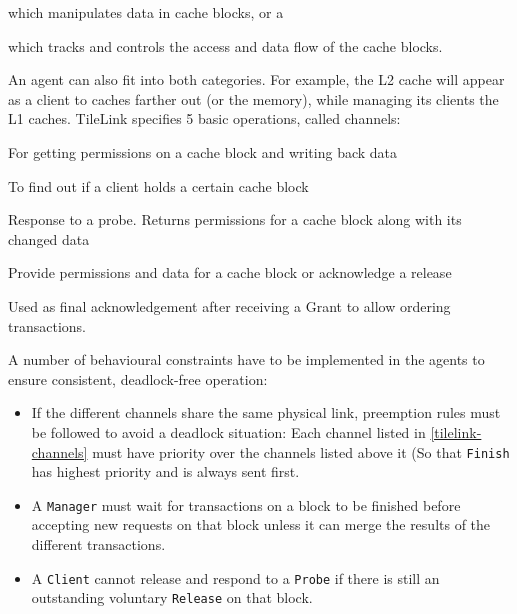 \documentclass[journal,a4paper]{IEEEtran}
\begin{document}
\begin{description}
	\item[\texttt{Client}] which manipulates data in cache blocks, or a
	\item[\texttt{Manager}] which tracks and controls the access and data flow of the cache blocks.
\end{description}
An agent can also fit into both categories. For example, the L2 cache will appear as a client to caches farther out (or the memory), while managing its clients the L1 caches.
TileLink specifies 5 basic operations, called channels:
\begin{description}
		\label{tilelink-channels}
	\item[\texttt{Acquire}] For getting permissions on a cache block and writing back data
	\item[\texttt{Probe}] To find out if a client holds a certain cache block
	\item[\texttt{Release}] Response to a probe. Returns permissions for a cache block along with its changed data
	\item[\texttt{Grant}] Provide permissions and data for a cache block or acknowledge a release
	\item[\texttt{Finish}] Used as final acknowledgement after receiving a Grant to allow ordering transactions.
\end{description}
A number of behavioural constraints have to be implemented in the agents to ensure consistent, deadlock-free operation:
\begin{itemize}
	\item If the different channels share the same physical link, preemption rules must be followed to avoid a deadlock situation: Each channel listed in \ref{tilelink-channels} must have priority over the channels listed above it (So that \texttt{Finish} has highest priority and is always sent first.
	\item A \texttt{Manager} must wait for transactions on a block to be finished before accepting new requests on that block unless it can merge the results of the different transactions.
	\item A \texttt{Client} cannot release and respond to a \texttt{Probe} if there is still an outstanding voluntary \texttt{Release} on that block.
\end{itemize}
\end{document}
